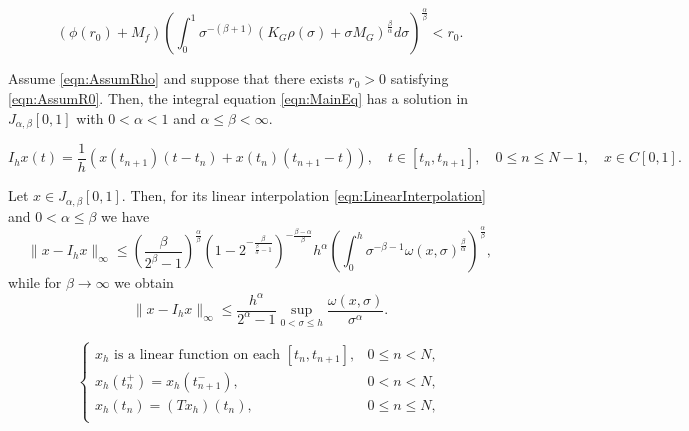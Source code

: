 \documentclass[10pt,a4paper]{amsart}
\begin{document}
	\begin{equation}\label{eqn:AssumR0}
		\left(\phi(r_0) + M_f\right)  \left(\int_0^1 \sigma^{-(\beta+1)} \left(K_G\rho(\sigma) + \sigma M_G \right)^\frac{\beta}{\alpha} d\sigma\right)^\frac{\alpha}{\beta} < r_0.
	\end{equation}

\begin{thm}\label{thm:Existence}
	Assume \eqref{eqn:AssumRho} and suppose that there exists $r_0>0$ satisfying \eqref{eqn:AssumR0}. Then, the integral equation \eqref{eqn:MainEq} has a solution in $J_{\alpha,\beta}[0,1]$ with $0<\alpha<1$ and $\alpha\leq \beta<\infty$. 
\end{thm}

\begin{equation}\label{eqn:LinearInterpolation}
	I_h x(t) = \frac{1}{h} \left(x(t_{n+1}) (t- t_n) + x(t_n) (t_{n+1}- t)\right), \quad t \in [t_{n}, t_{n+1}], \quad 0\leq n \leq N-1, \quad x \in C[0,1].
\end{equation}

\begin{prop}\label{prop:LInftyJInterpolation}
	Let $x \in J_{\alpha,\beta}[0,1]$. Then, for its linear interpolation \eqref{eqn:LinearInterpolation} and $0<\alpha\leq \beta$ we have
	\begin{equation}
		\|x - I_h x\|_\infty \leq \left(\frac{\beta}{2^{\beta}-1}\right)^\frac{\alpha}{\beta} \left(1-2^{-\frac{\beta}{\frac{\beta}{\alpha}-1}}\right)^{-\frac{\beta - \alpha}{\beta}}h^\alpha \left(\int_0^h \sigma^{-\beta-1} \omega(x,\sigma)^\frac{\beta}{\alpha}\right)^\frac{\alpha}{\beta},
	\end{equation}
	while for $\beta\rightarrow\infty$ we obtain
	\begin{equation}
		\|x-I_h x\|_\infty \leq \frac{h^\alpha}{2^{\alpha}-1} \sup_{0<\sigma\leq h}\frac{\omega(x,\sigma)}{\sigma^\alpha}.
	\end{equation}
\end{prop}

\begin{equation}\label{eqn:LinearCollocationScheme}
	\begin{cases}
		x_h \text{ is a linear function on each } [t_n, t_{n+1}], & 0 \leq n < N, \\
		x_h(t_n^+) = x_h(t_{n+1}^-), & 0 < n < N, \\
		x_h(t_n) = (Tx_h)(t_n), & 0 \leq n \leq N, \\
	\end{cases}
\end{equation}
\end{document}
